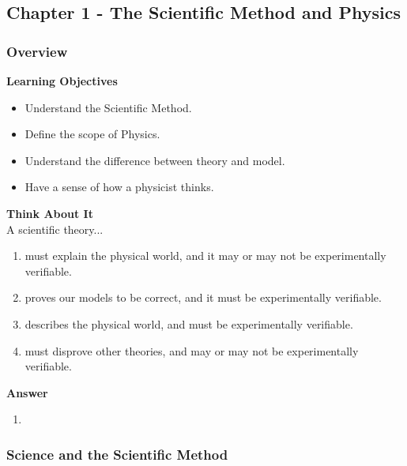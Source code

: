 \subsection{Chapter 1 - The Scientific Method and Physics}

\subsubsection{Overview}\label{chap:introduction}

\begin{framed}
\textbf{Learning Objectives}\\
\begin{itemize}
\item Understand the Scientific Method.
\item Define the scope of Physics.
\item Understand the difference between theory and model.
\item Have a sense of how a physicist thinks.
\end{itemize}
\end{framed}

\begin{framed}
\textbf{Think About It}\\
A scientific theory...

\begin{enumerate}
\item must explain the physical world, and it may or may not be experimentally verifiable.
\item proves our models to be correct, and it must be experimentally verifiable.
\item describes the physical world, and must be experimentally verifiable.
\item must disprove other theories, and may or may not be experimentally verifiable.
\end{enumerate}

\begin{framed}
\textbf{Answer}\\
\begin{enumerate}[resume]
\item
\end{enumerate}
\end{framed}
\end{framed}

\subsubsection{Science and the Scientific Method}


